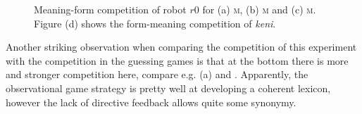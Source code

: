 \begin{figure}[t]
\centering
{}
\caption{Meaning-form competition of robot $r0$ for (a) \textsc{m}, (b) \textsc{m} and (c) \textsc{m}. Figure (d) shows the form-meaning competition of {\it keni}.}
\label{f:opt:cfoli}
\end{figure}

Another striking observation when comparing the competition of this experiment with the competition in the guessing games is that at the bottom there is more and stronger competition here, compare e.g.  (a) and . Apparently, the observational game strategy is pretty well at developing a coherent lexicon, however the lack of directive feedback allows quite some synonymy.


